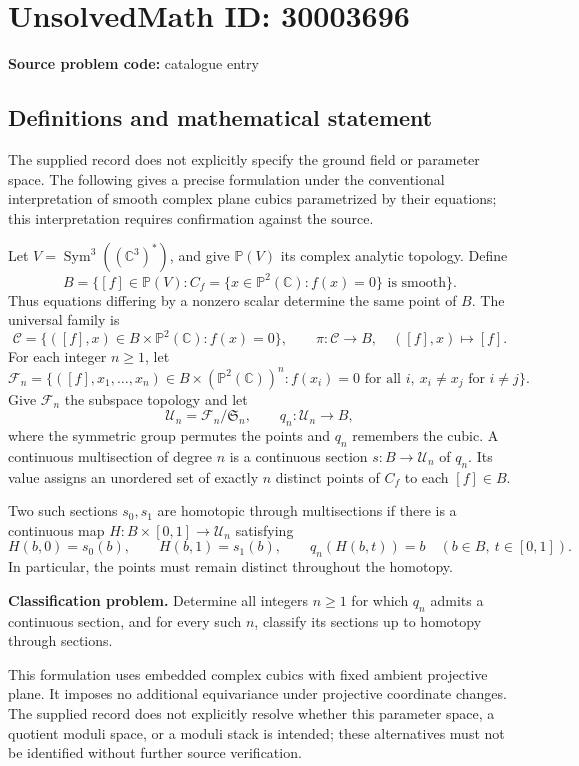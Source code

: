 \documentclass[11pt]{article}
\newcommand{\C}{\mathbb{C}}
\newcommand{\PP}{\mathbb{P}}
\begin{document}
\section*{UnsolvedMath ID: 30003696}
\textbf{Source problem code:} catalogue entry
\subsection{Definitions and mathematical statement}
The supplied record does not explicitly specify the ground field or parameter space. The following gives a precise formulation under the conventional interpretation of smooth complex plane cubics parametrized by their equations; this interpretation requires confirmation against the source.

Let \(V=\operatorname{Sym}^{3}((\C^{3})^{*})\), and give \(\PP(V)\) its complex analytic topology. Define
\[
B=\{[f]\in\PP(V): C_f=\{x\in\PP^{2}(\C):f(x)=0\}\text{ is smooth}\}.
\]
Thus equations differing by a nonzero scalar determine the same point of \(B\). The universal family is
\[
\mathcal C=\{([f],x)\in B\times\PP^{2}(\C):f(x)=0\},
\qquad \pi:\mathcal C\longrightarrow B,\quad ([f],x)\longmapsto[f].
\]
For each integer \(n\geq1\), let
\[
\mathcal F_n=\{([f],x_1,\ldots,x_n)\in B\times(\PP^{2}(\C))^n:
 f(x_i)=0\text{ for all }i,\ x_i\ne x_j\text{ for }i\ne j\}.
\]
Give \(\mathcal F_n\) the subspace topology and let
\[
\mathcal U_n=\mathcal F_n/\mathfrak S_n,
\qquad q_n:\mathcal U_n\longrightarrow B,
\]
where the symmetric group permutes the points and \(q_n\) remembers the cubic. A continuous multisection of degree \(n\) is a continuous section \(s:B\to\mathcal U_n\) of \(q_n\). Its value assigns an unordered set of exactly \(n\) distinct points of \(C_f\) to each \([f]\in B\).

Two such sections \(s_0,s_1\) are homotopic through multisections if there is a continuous map \(H:B\times[0,1]\to\mathcal U_n\) satisfying
\[
H(b,0)=s_0(b),\qquad H(b,1)=s_1(b),\qquad q_n(H(b,t))=b
\quad(b\in B,\ t\in[0,1]).
\]
In particular, the points must remain distinct throughout the homotopy.

\textbf{Classification problem.} Determine all integers \(n\geq1\) for which \(q_n\) admits a continuous section, and for every such \(n\), classify its sections up to homotopy through sections.

This formulation uses embedded complex cubics with fixed ambient projective plane. It imposes no additional equivariance under projective coordinate changes. The supplied record does not explicitly resolve whether this parameter space, a quotient moduli space, or a moduli stack is intended; these alternatives must not be identified without further source verification.
\end{document}
